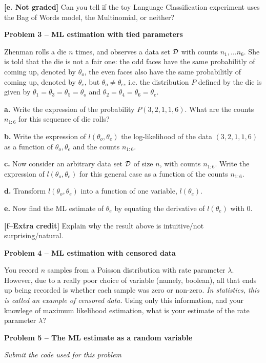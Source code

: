 \documentclass[10pt]{article}
\newcommand{\dataset}{{\cal D}}
\begin{document}
{\bf [e. Not graded]} Can you tell if the toy Language Classification experiment uses the Bag of Words model, the Multinomial, or neither?
 

{\bf Problem 3 -- ML estimation with tied parameters}

Zhenman rolls a die $n$ times, and observes a data set $\dataset$ with
counts $n_1,\ldots n_6$. She is told that the die is not a fair one:
the odd faces have the same probabilitly of coming up, denoted by
$\theta_o$, the even faces also have the same probabilitly of coming
up, denoted by $\theta_e$, but $\theta_o\neq \theta_e$, i.e. the
distribution $P$ defined by the die is given by
$\theta_1=\theta_3=\theta_5=\theta_o$ and
$\theta_2=\theta_4=\theta_6=\theta_e$.

{\bf a.}  Write the expression of the probability $P(3, 2, 1, 1, 6)$. What are the counts $n_{1:6}$ for this sequence of die rolls?

{\bf b.} Write the expression of $l(\theta_o,\theta_e)$ the
log-likelihood of the data $(3,2,1,1,6)$ as a function of
$\theta_o,\theta_e$ and the counts $n_{1:6}$.

{\bf c.} Now consider an arbitrary data set $\dataset$ of size $n$, with counts $n_{1:6}$. Write the expression of $l(\theta_o,\theta_e)$ for this general case as a function of the counts $n_{1:6}$. 

{\bf d.} Transform $l(\theta_o,\theta_e)$ into a function of one
variable, $l(\theta_e)$.

{\bf e.} Now find the ML estimate of $\theta_e$ by equating the
derivative of $l(\theta_e)$ with 0. 

{\bf [f--Extra credit]} Explain why the result above is intuitive/not
surprising/natural.


{\bf Problem 4 -- ML estimation with censored data}

You record $n$ samples from a Poisson distribution with rate
parameter $\lambda$. However, due to a really poor choice of variable
(namely, boolean), all that ends up being recorded is whether each
sample was zero or non-zero. {\em In statistics, this is called an example of censored data.} Using only this information, and your
knowlege of maximum likelihood estimation, what is your estimate of
the rate parameter $\lambda$?


{\bf Problem 5 -- The ML estimate as a random variable} 


{\em Submit the code used for this problem}
\end{document}
